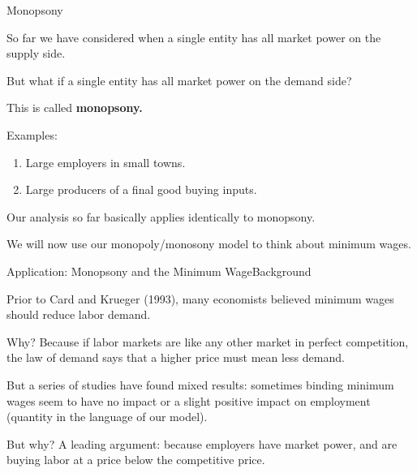 \documentclass[aspectratio=169]{beamer}
\newenvironment{wideitemize}{\itemize\addtolength{\itemsep}{10pt}}{\enditemize}
\begin{document}
\begin{frame}{Monopsony}
\begin{wideitemize}
        \item So far we have considered when a single entity has all market power on the supply side.
        \item But what if a single entity has all market power on the demand side?
        \item This is called \textbf{monopsony.}
        \item Examples:
        \begin{enumerate}
            \item Large employers in small towns.
            \item Large producers of a final good buying inputs.
        \end{enumerate}
        \item Our analysis so far basically applies identically to monopsony.
        \item We will now use our monopoly/monosony model to think about minimum wages.
\end{wideitemize}
    
\end{frame}

\begin{frame}{Application: Monopsony and the Minimum Wage}{Background}

\begin{wideitemize}
        \item Prior to Card and Krueger (1993), many economists believed minimum wages should reduce labor demand.
        \item Why? Because if labor markets are like any other market in perfect competition, the law of demand says that a higher price must mean less demand.
        \item But a series of studies have found mixed results: sometimes binding minimum wages seem to have no impact or a slight positive impact on employment (quantity in the language of our model).
        \item But why? A leading argument: because employers have market power, and are buying labor at a price below the competitive price.
\end{wideitemize}
\end{frame}
\end{document}
